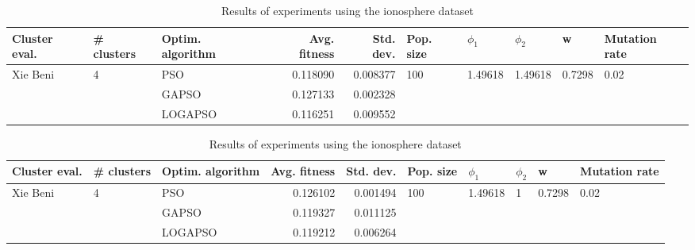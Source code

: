 \documentclass{article}
\begin{document}
\begin{table}
\centering
\caption{Results of experiments using the ionosphere dataset}
\begin{tabular}{lllrrlllll}
\toprule
            Cluster eval. &        \# clusters & Optim. algorithm &  Avg. fitness &  Std. dev. &            Pop. size &               $\phi_{1}$ &               $\phi_{2}$ &                       w &         Mutation rate \\
\midrule
\multirow{3}{*}{Xie Beni} & \multirow{3}{*}{4} &              PSO &      0.118090 &   0.008377 & \multirow{3}{*}{100} & \multirow{3}{*}{1.49618} & \multirow{3}{*}{1.49618} & \multirow{3}{*}{0.7298} & \multirow{3}{*}{0.02} \\
                          &                    &            GAPSO &      0.127133 &   0.002328 &                      &                          &                          &                         &                       \\
                          &                    &          LOGAPSO &      0.116251 &   0.009552 &                      &                          &                          &                         &                       \\
\bottomrule
\end{tabular}
\end{table}
\begin{table}
\centering
\caption{Results of experiments using the ionosphere dataset}
\begin{tabular}{lllrrlllll}
\toprule
            Cluster eval. &        \# clusters & Optim. algorithm &  Avg. fitness &  Std. dev. &            Pop. size &               $\phi_{1}$ &         $\phi_{2}$ &                       w &         Mutation rate \\
\midrule
\multirow{3}{*}{Xie Beni} & \multirow{3}{*}{4} &              PSO &      0.126102 &   0.001494 & \multirow{3}{*}{100} & \multirow{3}{*}{1.49618} & \multirow{3}{*}{1} & \multirow{3}{*}{0.7298} & \multirow{3}{*}{0.02} \\
                          &                    &            GAPSO &      0.119327 &   0.011125 &                      &                          &                    &                         &                       \\
                          &                    &          LOGAPSO &      0.119212 &   0.006264 &                      &                          &                    &                         &                       \\
\bottomrule
\end{tabular}
\end{table}
\end{document}
